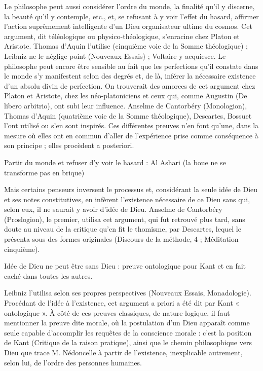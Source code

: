 Le philosophe peut aussi considérer l'ordre du monde, la finalité qu'il y discerne, la beauté qu'il y contemple, etc., et, se refusant à y voir l'effet du hasard, affirmer l'action suprêmement intelligente d'un Dieu organisateur ultime du cosmos. Cet argument, dit téléologique ou physico-théologique, s'enracine chez Platon et Aristote. Thomas d'Aquin l'utilise (cinquième voie de la Somme théologique) ; Leibniz ne le néglige point (Nouveaux Essais) ; Voltaire y acquiesce. Le philosophe peut encore être sensible au fait que les perfections qu'il constate dans le monde s'y manifestent selon des degrés et, de là, inférer la nécessaire existence d'un absolu divin de perfection. On trouverait des amorces de cet argument chez Platon et Aristote, chez les néo-platoniciens et ceux qui, comme Augustin (De libero arbitrio), ont subi leur influence. Anselme de Cantorbéry (Monologion), Thomas d'Aquin (quatrième voie de la Somme théologique), Descartes, Bossuet l'ont utilisé ou s'en sont inspirés. Ces différentes preuves n'en font qu'une, dans la mesure où elles ont en commun d'aller de l'expérience prise comme conséquence à son principe ; elles procèdent a posteriori. 
\begin{Synthesis}
Partir du monde et refuser d'y voir le hasard : Al Ashari (la boue ne se transforme pas en brique)
\end{Synthesis}
Mais certains penseurs inversent le processus et, considérant la seule idée de Dieu et ses notes constitutives, en infèrent l'existence nécessaire de ce Dieu sans qui, selon eux, il ne saurait y avoir d'idée de Dieu. Anselme de Cantorbéry (Proslogion), le premier, utilisa cet argument, qui fut retrouvé plus tard, sans doute au niveau de la critique qu'en fit le thomisme, par Descartes, lequel le présenta sous des formes originales (Discours de la méthode, 4 ; Méditation cinquième). 
\begin{Synthesis}
Idée de Dieu ne peut être sans Dieu : preuve ontologique pour Kant et en fait caché dans toutes les autres.
\end{Synthesis}
Leibniz l'utilisa selon ses propres perspectives (Nouveaux Essais, Monadologie). Procédant de l'idée à l'existence, cet argument a priori a été dit par Kant « ontologique ». À côté de ces preuves classiques, de nature logique, il faut mentionner la preuve dite morale, où la postulation d'un Dieu apparaît comme seule capable d'accomplir les requêtes de la conscience morale : c'est la position de Kant (Critique de la raison pratique), ainsi que le chemin philosophique vers Dieu que trace M. Nédoncelle à partir de l'existence, inexplicable autrement, selon lui, de l'ordre des personnes humaines.

